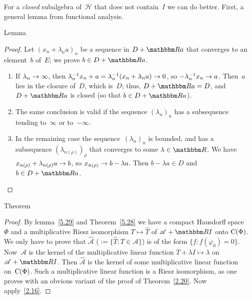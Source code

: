 \documentclass[main.tex]{subfiles}
\begin{document}
For a \emph{closed} subalgebra of~$\mathscr H$
that does not contain~$I$
we can do better.
First, a general lemma from functional analysis.
%
%
\begin{psec}{5.29}{Lemma}\end{psec}
\begin{proof}
Let $(x_n+\lambda_na)_n$ be a sequence in $D+\R a$
that converges to an element~$b$ of~$E$;
we prove $b\in D+\R a$.
\begin{enumerate}[label=(\Roman*)]
\item\label{5.29-I}
If $\lambda_n\rightarrow \infty$,
then $\lambda_n^{-1}x_n+a = \lambda_n^{-1}(x_n+\lambda_n a)\rightarrow 0$,
so $-\lambda_n^{-1}x_n\rightarrow a$.
Then~$a$ lies in the closure of~$D$, which is~$D$;
thus, $D+\R a=D$,
and $D+\R a$ is closed (so that $b\in D+\R a$).
%
\item\label{5.29-II}
The same conclusion is valid if the sequence $(\lambda_n)_n$
has a subsequence tending to~$\infty$ or to~$-\infty$.
%
\item\label{5.29-III}
In the remaining case
the sequence~$(\lambda_n)_n$ is bounded,
and has a subsequence $(\lambda_{n(\rho)})_\rho$
that converges to some $\lambda\in\R$.
We have $x_{n(\rho)}+\lambda_{n(\rho)} a\rightarrow b$,
so $x_{n(\rho)}\rightarrow b-\lambda a$.
Then $b-\lambda a\in D$ and $b\in D+\R a$. \xqed
\end{enumerate}
\end{proof}
%
%
\begin{psec}{5.30}{Theorem}\end{psec}
\begin{proof}
By lemma~\ref{5.29} and Theorem~\ref{5.28}
we have a compact Hausdorff space~$\Phi$
and a multiplicative Riesz isomorphism $T\mapsto \hat T$
of $\mathscr A+\R I$ onto $\mathrm{C}(\Phi)$.
We only have to prove that $\hat{\mathscr A}$ 
($:=\{\hat T\colon T\in\mathscr A\}$)
is of the form $\{f\colon f(\varphi_0)=0\}$.
Now~$\mathscr A$ is the kernel of the multiplicative
linear function $T+\lambda I\mapsto \lambda$ on $\mathscr A+\R I$.
Then $\hat{\mathscr A}$ is the kernel of some
multiplicative linear function on~$\mathrm{C}(\Phi)$.
Such a multiplicative linear function is a Riesz isomorphism,
as one proves with an obvious variant
of the proof of Theorem~\ref{2.20}.
Now apply~\ref{2.16}. \xqed
\end{proof}
\end{document}
